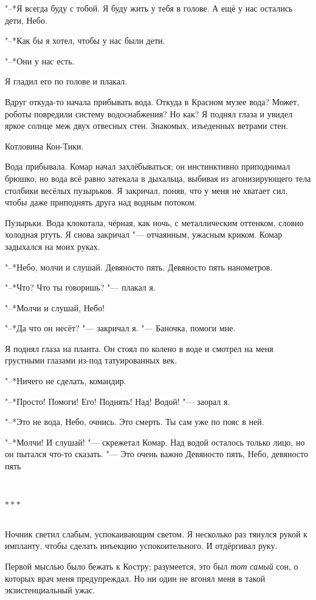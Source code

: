 \documentclass[a4paper,10pt]{book}
\newcommand{\ldotst}{\so{...}\xspace}
\newcommand{\razd}{~\\{\centering\Large\bfseries$\ast \ast \ast$\par}~\\}
\begin{document}
"--*Я всегда буду с тобой. Я буду жить у тебя в голове. А ещё у нас остались 
дети, Небо.

"--*Как бы я хотел, чтобы у нас были дети.

"--*Они у нас есть.

Я гладил его по голове и плакал.

Вдруг откуда-то начала прибывать вода. Откуда в Красном музее вода? Может, 
роботы повредили систему водоснабжения? Но как? Я поднял глаза\ldotst и увидел 
яркое солнце меж двух отвесных стен. Знакомых, изъеденных ветрами стен.

Котловина Кон-Тики.

Вода прибывала. Комар начал захлёбываться; он инстинктивно приподнимал брюшко, 
но вода всё равно затекала в дыхальца, выбивая из агонизирующего тела столбики 
весёлых пузырьков. Я закричал, поняв, что у меня не хватает сил, чтобы даже 
приподнять друга над водным потоком.

Пузырьки. Вода клокотала, чёрная, как ночь, с металлическим оттенком, словно 
холодная ртуть. Я снова закричал "--- отчаянным, 
ужасным криком. Комар задыхался на моих руках.

"--*Небо, молчи и слушай. Девяносто пять. Девяносто пять нанометров.

"--*Что? Что ты говоришь? "--- плакал я.

"--*Молчи и слушай, Небо!

"--*Да что он несёт? "--- закричал я. "--- Баночка, помоги мне.

Я поднял глаза на планта. Он стоял по колено в воде и смотрел на меня грустными 
глазами из-под татуированных век.

"--*Ничего не сделать, командир.

"--*Просто! Помоги! Его! Поднять! Над! Водой! "--- заорал я.

"--*Это не вода, Небо, очнись. Это смерть. Ты сам уже по пояс в ней.

"--*Молчи! И слушай! "--- скрежетал Комар. Над водой осталось только лицо, но 
он пытался что-то сказать. "--- Это очень важно\ldotst Девяносто 
пять, Небо, девяносто пять\ldotst

\razd

Ночник светил слабым, успокаивающим светом. Я несколько раз тянулся рукой к 
импланту, чтобы сделать инъекцию успокоительного. И отдёргивал руку.

Первой мыслью было бежать к Костру; разумеется, это был \textit{тот самый} сон, 
о которых врач меня предупреждал. Но ни один не вгонял меня в такой 
экзистенциальный ужас.
\end{document}

